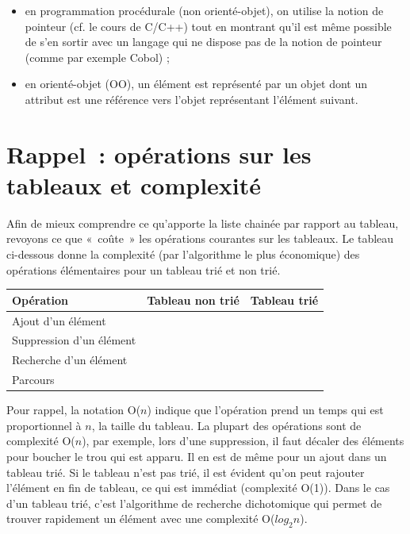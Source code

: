 	\begin{itemize}
		\item
			en programmation procédurale (non orienté-objet), 
			on utilise la notion de pointeur (cf. le cours de C/C++) tout en
			montrant qu'il est même possible de s'en sortir avec un langage 
			qui ne dispose pas de la notion de pointeur (comme par exemple Cobol) ;
		\item
			en orienté-objet (OO), un élément est représenté par un objet 
			dont un attribut est une référence vers l'objet
			représentant l'élément suivant.
	\end{itemize}


\section{Rappel~: opérations sur les tableaux et complexité}

	Afin de mieux comprendre ce qu'apporte la liste chainée 
	par rapport au tableau, revoyons ce que «~coûte~» les opérations
	courantes sur les tableaux. Le tableau ci-dessous donne la complexité 
	(par l'algorithme le plus économique) des
	opérations élémentaires pour un tableau trié et non trié.

	\begin{center}
		\tablefirsthead{}
		\tablehead{}
		\tabletail{}
		\tablelasttail{}
		\begin{supertabular}{|m{5.511cm}|m{3.6139998cm}|m{3.631cm}|}
		\hline
		\bfseries Opération &
		\bfseries Tableau non trié &
		\bfseries Tableau trié\\
		\hline
		Ajout d'un élément &
		 &
		\centering{}\\
		\hline
		{Suppression d'un élément} &
		 &
		\centering{}\\
		\hline
		{Recherche d'un élément} &
		 &
		\centering{}\\
		\hline
		{Parcours} &
		 &
		\centering{}\\\hline
		\end{supertabular}
	\end{center}
	
	Pour rappel, la notation O($n$) indique que l'opération 
	prend un temps qui est proportionnel à $n$, la
	taille du tableau. La plupart des opérations sont de complexité 
	O($n$), par exemple, lors d'une suppression, il
	faut décaler des éléments pour boucher le trou qui est apparu. 
	Il en est de même pour un ajout dans un tableau trié. Si
	le tableau n'est pas trié, il est évident qu'on peut rajouter 
	l'élément en fin de tableau, ce qui est immédiat
	(complexité O(1)). Dans le cas d'un tableau trié, c'est 
	l'algorithme de recherche dichotomique qui permet de trouver
	rapidement un élément avec une complexité O($log_{2}n$).

